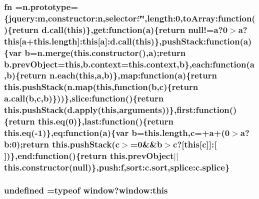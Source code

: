 \subsubsection[{fn}]{ fn ={\bf n.\+prototype}=\{jquery\+:m,constructor\+:n,selector\+:\char`\"{}\char`\"{},length\+:0,to\+Array\+:function()\{return {\bf d.\+call}({\bf this})\},get\+:function({\bf a})\{return null!={\bf a}?0$>${\bf a}?{\bf this}\mbox{[}{\bf a}+this.\+length\mbox{]}\+:{\bf this}\mbox{[}{\bf a}\mbox{]}\+:{\bf d.\+call}({\bf this})\},push\+Stack\+:function({\bf a})\{var {\bf b}={\bf n.\+merge}(this.\+constructor(),{\bf a});return b.\+prev\+Object={\bf this},b.\+context=this.\+context,{\bf b}\},each\+:function({\bf a},{\bf b})\{return {\bf n.\+each}({\bf this},{\bf a},{\bf b})\},map\+:function({\bf a})\{return this.\+push\+Stack({\bf n.\+map}({\bf this},function({\bf b},{\bf c})\{return {\bf a.\+call}({\bf b},{\bf c},{\bf b})\}))\},slice\+:function()\{return this.\+push\+Stack(d.\+apply({\bf this},arguments))\},first\+:function()\{return this.\+eq(0)\},last\+:function()\{return this.\+eq(-\/1)\},eq\+:function({\bf a})\{var {\bf b}=this.\+length,{\bf c}=+{\bf a}+(0$>${\bf a}?b\+:0);return this.\+push\+Stack({\bf c}$>$=0\&\&{\bf b}$>${\bf c}?\mbox{[}{\bf this}\mbox{[}{\bf c}\mbox{]}\mbox{]}\+:\mbox{[}$\,$\mbox{]})\},end\+:function()\{return this.\+prev\+Object$\vert$$\vert$this.\+constructor(null)\},push\+:f,{\bf sort\+:c.\+sort},splice\+:c.\+splice\}}\label{jquery-2_81_83_8min_8js_a4f0af84f62a6e2f4aee1d072192b48ec}
\hypertarget{jquery-2_81_83_8min_8js_ae21cc36bf0d65014c717a481a3f8a468}{}
\subsubsection[{undefined}]{\setlength{\rightskip}{0pt plus 5cm}undefined =typeof {\bf window}?window\+:this}\label{jquery-2_81_83_8min_8js_ae21cc36bf0d65014c717a481a3f8a468}
